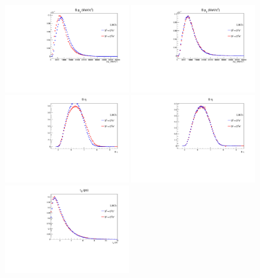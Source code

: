 \begin{figure}[t]
  \begin{center}
   \includegraphics[width=0.49\textwidth]{AA-Appdx-OSTaggers/figs/BPT_BuVSBd_Unweighted.pdf}
   \includegraphics[width=0.49\textwidth]{AA-Appdx-OSTaggers/figs/BPT_BuVSBd_Weighted.pdf} \\
   \includegraphics[width=0.49\textwidth]{AA-Appdx-OSTaggers/figs/BETA_BuVSBd_Unweighted.pdf}
   \includegraphics[width=0.49\textwidth]{AA-Appdx-OSTaggers/figs/BETA_BuVSBd_Weighted.pdf} \\
   \includegraphics[width=0.49\textwidth]{AA-Appdx-OSTaggers/figs/BTAU_BuVSBd_Unweighted.pdf}

\end{center}
\end{figure}
